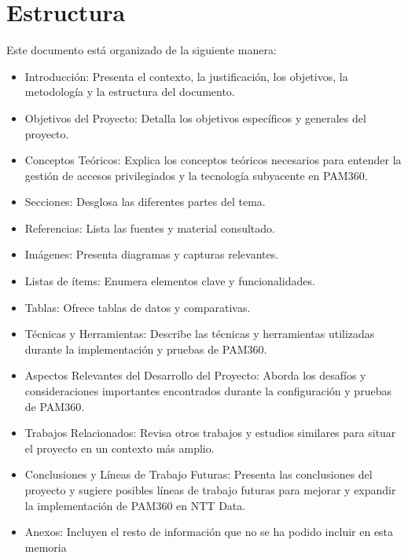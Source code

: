 \section{Estructura}
Este documento está organizado de la siguiente manera:

\begin{itemize}
\item Introducción: Presenta el contexto, la justificación, los objetivos, la metodología y la estructura del documento.

\item Objetivos del Proyecto: Detalla los objetivos específicos y generales del proyecto.

\item Conceptos Teóricos: Explica los conceptos teóricos necesarios para entender la gestión de accesos privilegiados y la tecnología subyacente en PAM360.

      \item Secciones: Desglosa las diferentes partes del tema.
      \item Referencias: Lista las fuentes y material consultado.
      \item Imágenes: Presenta diagramas y capturas relevantes.
      \item Listas de ítems: Enumera elementos clave y funcionalidades.
      \item Tablas: Ofrece tablas de datos y comparativas.  
\item Técnicas y Herramientas: Describe las técnicas y herramientas utilizadas durante la implementación y pruebas de PAM360.
\item Aspectos Relevantes del Desarrollo del Proyecto: Aborda los desafíos y consideraciones importantes encontrados durante la configuración y pruebas de PAM360.
\item Trabajos Relacionados: Revisa otros trabajos y estudios similares para situar el proyecto en un contexto más amplio.
\item Conclusiones y Líneas de Trabajo Futuras: Presenta las conclusiones del proyecto y sugiere posibles líneas de trabajo futuras para mejorar y expandir la implementación de PAM360 en NTT Data.
\item Anexos: Incluyen el resto de información que no se ha podido incluir en esta memoria
\end{itemize}